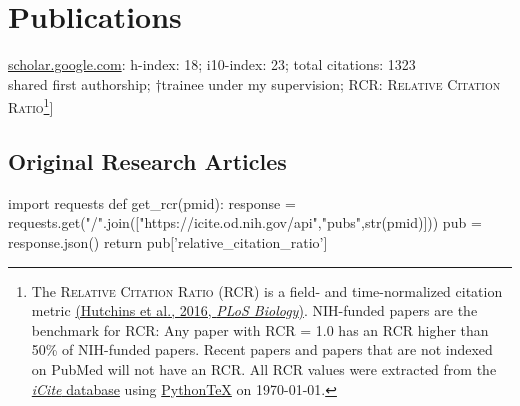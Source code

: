 \documentclass[11pt, letterpaper]{article}
\newcommand{\pytex}{Python\TeX}
\begin{document}
\section*{Publications}
\aiGoogleScholar \hspace{.01cm} \href{https://scholar.google.com/citations?user=czV7OcQAAAAJ&hl=en}{scholar.google.com}: h-index: 18; i10-index: 23; total citations: 1323 \\ 
\lbrack*shared first authorship; †trainee under my supervision; RCR: \textsc{Relative Citation Ratio}\footnote{The \textsc{Relative Citation Ratio} (RCR) is a field- and time-normalized citation metric \href{http://journals.plos.org/plosbiology/article?id=10.1371/journal.pbio.1002541}{(Hutchins et al., 2016, \textit{PLoS Biology})}. NIH-funded papers are the benchmark for RCR: Any paper with RCR = 1.0 has an RCR higher than 50\% of NIH-funded papers. Recent papers and papers that are not indexed on PubMed will not have an RCR. All RCR values were extracted from the \href{https://icite.od.nih.gov/stats}{\textit{iCite} database} using \href{https://github.com/gpoore/pythontex}{\pytex} on \today.}]

\subsection*{Original Research Articles}

\begin{pycode}
import requests
def get_rcr(pmid):
    response = requests.get("/".join(["https://icite.od.nih.gov/api","pubs",str(pmid)]))
    pub = response.json()
    return pub['relative_citation_ratio']
\end{pycode}
\end{document}
